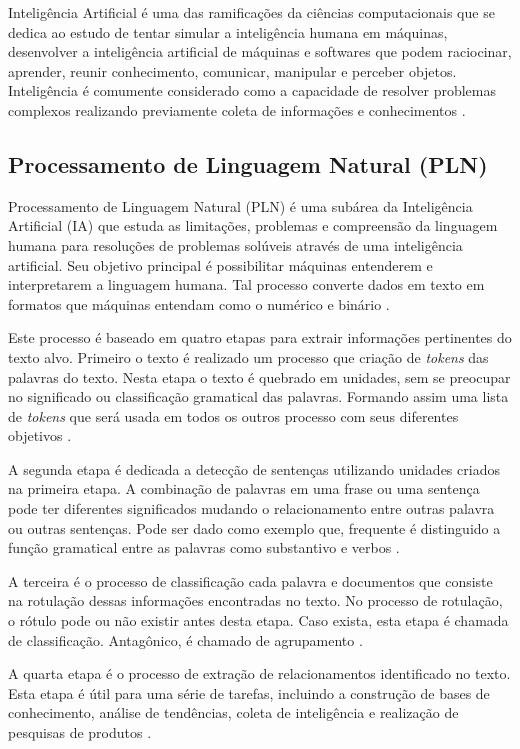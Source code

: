 Inteligência Artificial é uma das ramificações da ciências computacionais que se dedica ao estudo de tentar simular a inteligência humana em máquinas, desenvolver a inteligência artificial de máquinas e softwares que podem raciocinar, aprender, reunir conhecimento, comunicar, manipular e perceber objetos. Inteligência é comumente considerado como a capacidade de resolver problemas complexos realizando previamente coleta de informações e conhecimentos \cite{Pannu:2015}.

\subsection{Processamento de Linguagem Natural (PLN)} Processamento de Linguagem Natural (PLN) é uma subárea da Inteligência Artificial (IA) que estuda as limitações, problemas e compreensão da linguagem humana para resoluções de problemas solúveis através de uma inteligência artificial.  Seu objetivo principal é possibilitar máquinas entenderem e interpretarem a linguagem humana. Tal processo converte dados em texto em formatos que máquinas entendam como o numérico e binário \cite{Kulkarni:2019}.

Este processo é baseado em quatro etapas para extrair informações pertinentes do texto alvo. Primeiro o texto é realizado um processo que criação de \textit{tokens} das palavras do texto. Nesta etapa o texto é quebrado em unidades, sem se preocupar no significado ou classificação gramatical das palavras. Formando assim uma lista de \textit{tokens} que será usada em todos os outros processo com seus diferentes objetivos \cite{Reese:2015}.

A segunda etapa é dedicada a detecção de sentenças utilizando unidades criados na primeira etapa. A combinação de palavras em uma frase ou uma sentença pode ter diferentes significados mudando o relacionamento entre outras palavra ou outras sentenças. Pode ser dado como exemplo que, frequente é distinguido a função gramatical entre as palavras como substantivo e verbos \cite{Reese:2015}.

A terceira é o processo de classificação cada palavra e documentos que consiste na rotulação dessas informações encontradas no texto. No processo de rotulação, o rótulo pode ou não existir antes desta etapa. Caso exista, esta etapa é chamada de classificação. Antagônico, é chamado de agrupamento \cite{Reese:2015}.

A quarta etapa é o processo de extração de relacionamentos identificado no texto. Esta etapa é útil para uma série de tarefas, incluindo a construção de bases de conhecimento, análise de tendências, coleta de inteligência e realização de pesquisas de produtos \cite{Reese:2015}.
